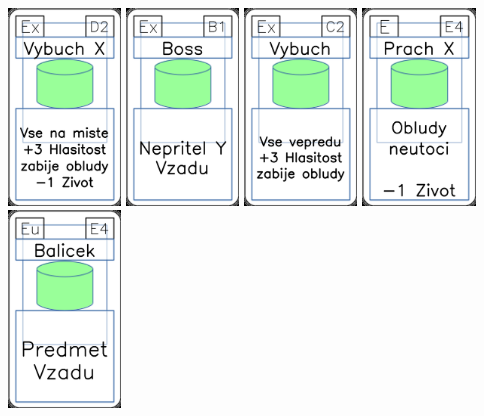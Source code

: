 \documentclass[a4paper]{article}
\begin{document}
	\includegraphics[width=3.0cm]{img-4_16}
	\includegraphics[width=3.0cm]{img-4_5}
	\includegraphics[width=3.0cm]{img-4_11}
	\includegraphics[width=3.0cm]{img-4_53}
	\includegraphics[width=3.0cm]{img-4_23}
\end{document}
